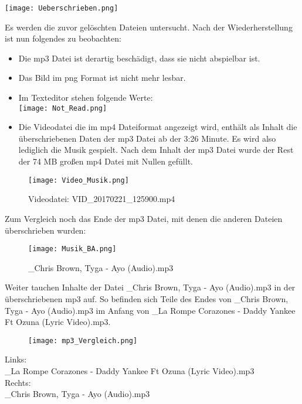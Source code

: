 \documentclass[10pt,a4paper]{article} %
\begin{document}
\texttt{[image: Ueberschrieben.png]}

Es werden die zuvor gelöschten Dateien untersucht.
Nach der Wiederherstellung ist nun folgendes zu beobachten:
\begin{itemize}
\item Die mp3 Datei ist derartig beschädigt, dass sie nicht abspielbar ist.
\item Das Bild im png Format ist nicht mehr lesbar.
\item Im Texteditor stehen folgende Werte:\\
\texttt{[image: Not\_Read.png]}
\newpage
\item Die Videodatei die im mp4 Dateiformat angezeigt wird, enthält als Inhalt die überschriebenen Daten der mp3 Datei ab der 3:26 Minute. 
Es wird also lediglich die Musik gespielt. Nach dem Inhalt der mp3 Datei wurde der Rest der 74 MB großen mp4 Datei mit Nullen gefüllt.\\

\end{itemize}

\begin{figure}[ht]
\label{Bild}
	\centering
	 \texttt{[image: Video\_Musik.png]}
	\caption{Videodatei: \glqq VID\_20170221\_125900.mp4\grqq{}}
\end{figure}
Zum Vergleich noch das Ende der mp3 Datei, mit denen die anderen Dateien überschrieben wurden:

\begin{figure}[ht]
\label{Bild}
	\centering
	 \texttt{[image: Musik\_BA.png]}
	\caption{\_Chris Brown, Tyga - Ayo (Audio).mp3\grqq{}}
\end{figure}

Weiter tauchen Inhalte der Datei \_Chris Brown, Tyga - Ayo (Audio).mp3\grqq{} in der überschriebenen mp3 auf. So befinden sich Teile des Endes von \_Chris Brown, Tyga - Ayo (Audio).mp3\grqq{} im Anfang von  \_La Rompe Corazones - Daddy Yankee Ft Ozuna (Lyric Video).mp3\grqq{}.

\begin{figure}[ht]
\label{Bild}
	\centering
	 \texttt{[image: mp3\_Vergleich.png]}
\end{figure}
Links:\\ \_La Rompe Corazones - Daddy Yankee Ft Ozuna (Lyric Video).mp3\grqq{}\\
Rechts:\\ \_Chris Brown, Tyga - Ayo (Audio).mp3\grqq{}\\
\end{document}
